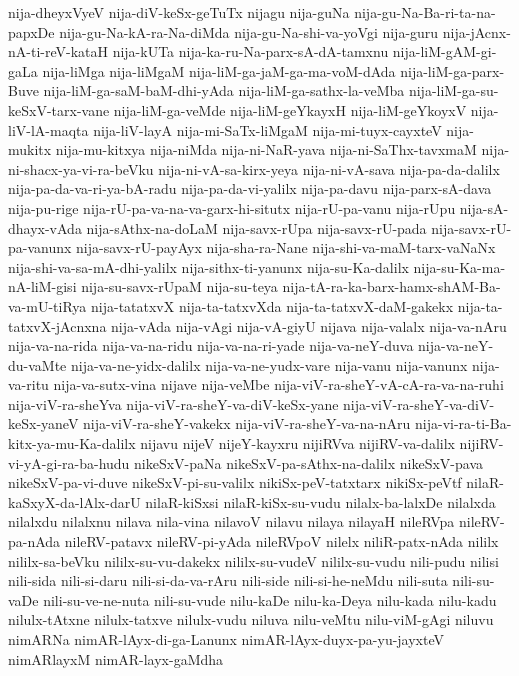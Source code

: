 {nija-dheyxVyeV
nija-diV-keSx-geTuTx
nijagu
nija-guNa
nija-gu-Na-Ba-ri-ta-na-papxDe
nija-gu-Na-kA-ra-Na-diMda
nija-gu-Na-shi-va-yoVgi
nija-guru
nija-jAcnx-nA-ti-reV-kataH
nija-kUTa
nija-ka-ru-Na-parx-sA-dA-tamxnu
nija-liM-gAM-gi-gaLa
nija-liMga
nija-liMgaM
nija-liM-ga-jaM-ga-ma-voM-dAda
nija-liM-ga-parx-Buve
nija-liM-ga-saM-baM-dhi-yAda
nija-liM-ga-sathx-la-veMba
nija-liM-ga-su-keSxV-tarx-vane
nija-liM-ga-veMde
nija-liM-geYkayxH
nija-liM-geYkoyxV
nija-liV-lA-maqta
nija-liV-layA
nija-mi-SaTx-liMgaM
nija-mi-tuyx-cayxteV
nija-mukitx
nija-mu-kitxya
nija-niMda
nija-ni-NaR-yava
nija-ni-SaThx-tavxmaM
nija-ni-shacx-ya-vi-ra-beVku
nija-ni-vA-sa-kirx-yeya
nija-ni-vA-sava
nija-pa-da-dalilx
nija-pa-da-va-ri-ya-bA-radu
nija-pa-da-vi-yalilx
nija-pa-davu
nija-parx-sA-dava
nija-pu-rige
nija-rU-pa-va-na-va-garx-hi-situtx
nija-rU-pa-vanu
nija-rUpu
nija-sA-dhayx-vAda
nija-sAthx-na-doLaM
nija-savx-rUpa
nija-savx-rU-pada
nija-savx-rU-pa-vanunx
nija-savx-rU-payAyx
nija-sha-ra-Nane
nija-shi-va-maM-tarx-vaNaNx
nija-shi-va-sa-mA-dhi-yalilx
nija-sithx-ti-yanunx
nija-su-Ka-dalilx
nija-su-Ka-ma-nA-liM-gisi
nija-su-savx-rUpaM
nija-su-teya
nija-tA-ra-ka-barx-hamx-shAM-Ba-va-mU-tiRya
nija-tatatxvX
nija-ta-tatxvXda
nija-ta-tatxvX-daM-gakekx
nija-ta-tatxvX-jAcnxna
nija-vAda
nija-vAgi
nija-vA-giyU
nijava
nija-valalx
nija-va-nAru
nija-va-na-rida
nija-va-na-ridu
nija-va-na-ri-yade
nija-va-neY-duva
nija-va-neY-du-vaMte
nija-va-ne-yidx-dalilx
nija-va-ne-yudx-vare
nija-vanu
nija-vanunx
nija-va-ritu
nija-va-sutx-vina
nijave
nija-veMbe
nija-viV-ra-sheY-vA-cA-ra-va-na-ruhi
nija-viV-ra-sheYva
nija-viV-ra-sheY-va-diV-keSx-yane
nija-viV-ra-sheY-va-diV-keSx-yaneV
nija-viV-ra-sheY-vakekx
nija-viV-ra-sheY-va-na-nAru
nija-vi-ra-ti-Ba-kitx-ya-mu-Ka-dalilx
nijavu
nijeV
nijeY-kayxru
nijiRVva
nijiRV-va-dalilx
nijiRV-vi-yA-gi-ra-ba-hudu
nikeSxV-paNa
nikeSxV-pa-sAthx-na-dalilx
nikeSxV-pava
nikeSxV-pa-vi-duve
nikeSxV-pi-su-valilx
nikiSx-peV-tatxtarx
nikiSx-peVtf
nilaR-kaSxyX-da-lAlx-darU
nilaR-kiSxsi
nilaR-kiSx-su-vudu
nilalx-ba-lalxDe
nilalxda
nilalxdu
nilalxnu
nilava
nila-vina
nilavoV
nilavu
nilaya
nilayaH
nileRVpa
nileRV-pa-nAda
nileRV-patavx
nileRV-pi-yAda
nileRVpoV
nilelx
niliR-patx-nAda
nililx
nililx-sa-beVku
nililx-su-vu-dakekx
nililx-su-vudeV
nililx-su-vudu
nili-pudu
nilisi
nili-sida
nili-si-daru
nili-si-da-va-rAru
nili-side
nili-si-he-neMdu
nili-suta
nili-su-vaDe
nili-su-ve-ne-nuta
nili-su-vude
nilu-kaDe
nilu-ka-Deya
nilu-kada
nilu-kadu
nilulx-tAtxne
nilulx-tatxve
nilulx-vudu
niluva
nilu-veMtu
nilu-viM-gAgi
niluvu
nimARNa
nimAR-lAyx-di-ga-Lanunx
nimAR-lAyx-duyx-pa-yu-jayxteV
nimARlayxM
nimAR-layx-gaMdha
}
